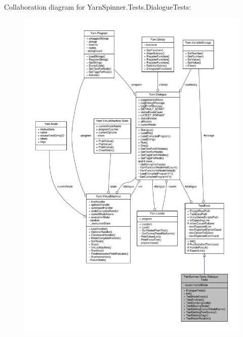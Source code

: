 Collaboration diagram for Yarn\-Spinner.\-Tests.\-Dialogue\-Tests\-:
\nopagebreak
\begin{figure}[H]
\begin{center}
\leavevmode
\includegraphics[width=350pt]{a00820}
\end{center}
\end{figure}
